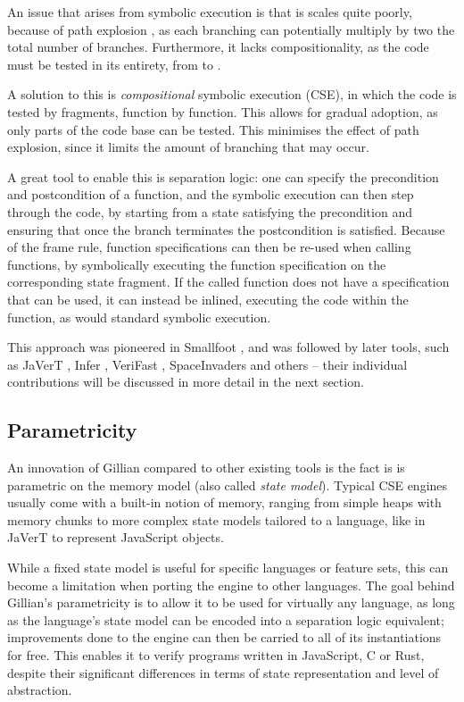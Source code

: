 An issue that arises from symbolic execution is that is scales quite poorly, because of path explosion \cite{pathexplo,surveysymex}, as each branching can potentially multiply by two the total number of branches. Furthermore, it lacks compositionality, as the code must be tested in its entirety, from  to .

A solution to this is \emph{compositional} symbolic execution (CSE), in which the code is tested by fragments, function by function. This allows for gradual adoption, as only parts of the code base can be tested. This minimises the effect of path explosion, since it limits the amount of branching that may occur.

A great tool to enable this is separation logic: one can specify the precondition and postcondition of a function, and the symbolic execution can then step through the code, by starting from a state satisfying the precondition and ensuring that once the branch terminates the postcondition is satisfied. Because of the frame rule, function specifications can then be re-used when calling functions, by symbolically executing the function specification on the corresponding state fragment. If the called function does not have a specification that can be used, it can instead be inlined, executing the code within the function, as would standard symbolic execution.

This approach was pioneered in Smallfoot \cite{smallfoot}, and was followed by later tools, such as JaVerT \cite{javert1, javert2}, Infer \cite{infer}, VeriFast \cite{verifast}, SpaceInvaders \cite{spaceinvader} and others -- their individual contributions will be discussed in more detail in the next section.

\subsection{Parametricity}

An innovation of Gillian compared to other existing tools is the fact is is parametric on the memory model (also called \emph{state model}). Typical CSE engines usually come with a built-in notion of memory, ranging from simple heaps with memory chunks \cite{verifast} to more complex state models tailored to a language, like in JaVerT \cite{javert1, javert2} to represent JavaScript objects.

While a fixed state model is useful for specific languages or feature sets, this can become a limitation when porting the engine to other languages. The goal behind Gillian's parametricity is to allow it to be used for virtually any language, as long as the language's state model can be encoded into a separation logic equivalent; improvements done to the engine can then be carried to all of its instantiations for free. This enables it to verify programs written in JavaScript, C or Rust, despite their significant differences in terms of state representation and level of abstraction.

